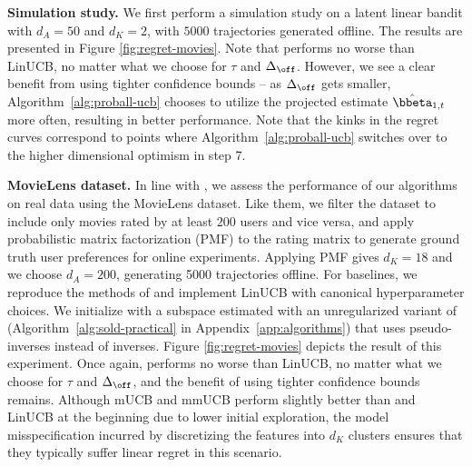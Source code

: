 \textbf{Simulation study.} We first perform a simulation study on a latent linear bandit with $d_A=50$ and $d_K=2$, with $5000$ trajectories generated offline. The results are presented in Figure \ref{fig:regret-movies}. Note that  performs no worse than LinUCB, no matter what we choose for $\tau$ and $\Delta_{\off}$. However, we see a clear benefit from using tighter confidence bounds -- as $\Delta_{\off}$ gets smaller, Algorithm~\ref{alg:proball-ucb} chooses to utilize the projected estimate $\hat\bbeta_{1,t}$ more often, resulting in better performance. Note that the kinks in the regret curves correspond to points where Algorithm~\ref{alg:proball-ucb} switches over to the higher dimensional optimism in step 7.

 
\textbf{MovieLens dataset.} In line with \cite{hong2020latent}, we assess the performance of our algorithms on real data using the MovieLens dataset. Like them, we filter the dataset to include only movies rated by at least $200$ users and vice versa, and apply probabilistic matrix factorization (PMF) to the rating matrix to generate ground truth user preferences for online experiments. Applying PMF gives $d_K = 18$ and we choose $d_A = 200$, generating 5000 trajectories offline. For baselines, we reproduce the methods of \cite{hong2020latent, hong2022thompsonsamplingmixtureprior} and implement LinUCB with canonical hyperparameter choices. We initialize  with a subspace estimated with an unregularized variant of  (Algorithm~\ref{alg:sold-practical} in Appendix~\ref{app:algorithms}) that uses pseudo-inverses instead of inverses. Figure \ref{fig:regret-movies} depicts the result of this experiment. Once again,  performs no worse than LinUCB, no matter what we choose for $\tau$ and $\Delta_{\off}$, and the benefit of using tighter confidence bounds remains. Although mUCB and mmUCB perform slightly better than  and LinUCB at the beginning due to lower initial exploration, the model misspecification incurred by discretizing the features into $d_K$ clusters ensures that they typically suffer linear regret in this scenario.


